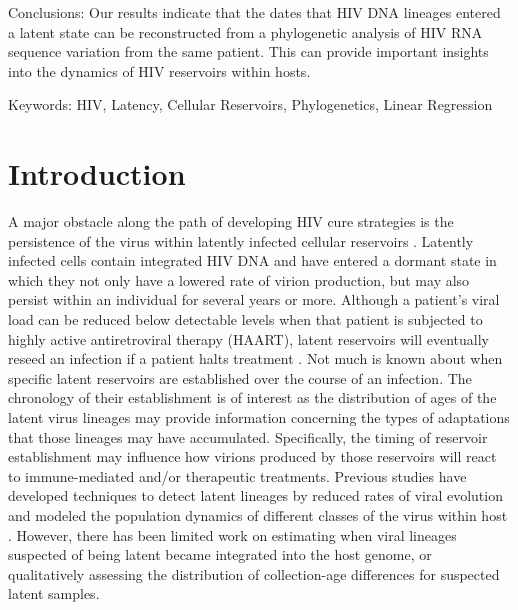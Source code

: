 \documentclass[12pt]{article}
\begin{document}
Conclusions: 
Our results indicate that the dates that HIV DNA lineages entered a latent state can be reconstructed from a phylogenetic analysis of HIV RNA sequence variation from the same patient.
This can provide important insights into the dynamics of HIV reservoirs within hosts.

Keywords: 
HIV, Latency, Cellular Reservoirs, Phylogenetics, Linear Regression\\



\underline{}
\section * {Introduction} \label{sec:intro}

A major obstacle along the path of developing HIV cure strategies is the persistence of the virus within latently infected cellular reservoirs \citep{Pace11}. 
Latently infected cells contain integrated HIV DNA and have entered a dormant state in which they not only have a lowered rate of virion production, but may also persist within an individual for several years or more.
Although a patient's viral load can be reduced below detectable levels when that patient is subjected to highly active antiretroviral therapy (HAART), latent reservoirs will eventually reseed an infection if a patient halts treatment \citep{Joos08, Pomerantz03, Richman09}. 
Not much is known about when specific latent reservoirs are established over the course of an infection. 
The chronology of their establishment is of interest as the distribution of ages of the latent virus lineages may provide information concerning the types of adaptations that those lineages may have accumulated. 
Specifically, the timing of reservoir establishment may influence how virions produced by those reservoirs will react to immune-mediated and/or therapeutic treatments. 
Previous studies have developed techniques to detect latent lineages by reduced rates of viral evolution \citep{Immonen14} and modeled the population dynamics of different classes of the virus within host \citep{Althaus14}. 
However, there has been limited work on estimating when viral lineages suspected of being latent became integrated into the host genome, or qualitatively assessing the distribution of collection-age differences for suspected latent samples.
\end{document}

